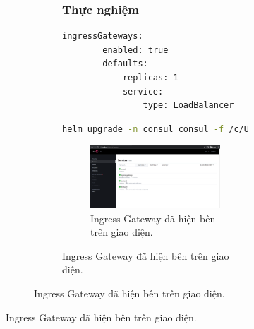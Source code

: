 \documentclass[12pt,a4paper]{report}
\begin{document}
\begin{figure}[h]
\begin{figure}[h]
\begin{figure}[h]
	\subsubsection{Thực nghiệm}
	\hspace{1.0cm}{Đầu tiên, để tạo ra ingress gateway, thì chúng ta cần cập nhật tệp tin values.yaml ở phần các bước triển khai. Chúng ta sẽ thêm vào một phần sau vào bên dưới tệp:}
	\begin{lstlisting}[language=Bash]
	ingressGateways:
		enabled: true
		defaults:
			replicas: 1	
			service:
				type: LoadBalancer
	\end{lstlisting}
	\hspace{1.0cm}{Sau khi thêm vào, chúng ta sẽ chạy câu lệnh sau để update chart của Consul}
	\begin{lstlisting}[language=Bash]
	helm upgrade -n consul consul -f /c/Users/justo/Desktop/Helm-chart/nestjs-helm/consul/helm/values.yaml hashicorp/consul
	\end{lstlisting}
	\hspace{1.0cm}{Sau khi helm upgrade xong chart, thì chúng ta sẽ truy cập vào giao diện của Consul và xem kết quả:}
	\pagebreak
	\begin{figure}[h]
	\centering
	\includegraphics[width=1\linewidth]{Pics/localhost-8500}
	\caption{\label{fig:localhost-8500} Ingress Gateway đã hiện bên trên giao diện.}
	\label{fig:localhost-8500}
	\end{figure}


\end{figure}
\end{figure}
\end{figure}
\end{document}
